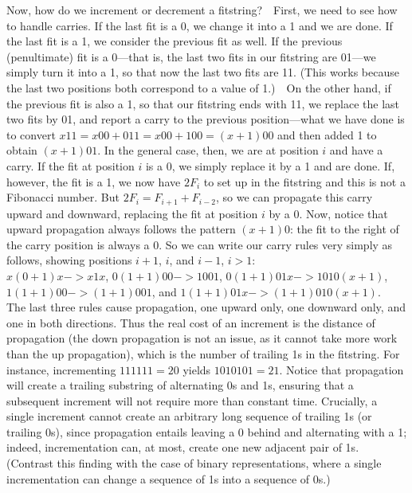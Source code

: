 \documentclass[11pt]{article}
\begin{document}
Now, how do we increment or decrement a fitstring?\ \ First, we need to see how
to handle carries.  If the last fit is a 0, we change it into a 1 and we are
done.  If the last fit is a 1, we consider the previous fit as well.  If the
previous (penultimate) fit is a 0---that is, the last two fits in our fitstring
are 01---we simply turn it into a 1, so that now the last two fits are 11.
(This works because the last two positions both correspond to a value of 1.)\ \
On the other hand, if the previous fit is also a 1, so that our fitstring ends
with 11, we replace the last two fits by 01, and report a carry to the previous
position---what we have done is to convert $x11 = x00 + 011 = x00 + 100 =
(x+1)00$ and then added 1 to obtain $(x+1)01$.  In the general case, then, we
are at position $i$ and have a carry.  If the fit at position $i$ is a 0, we
simply replace it by a 1 and are done.  If, however, the fit is a 1, we now
have $2F_i$ to set up in the fitstring and this is not a Fibonacci number.  But
$2F_i = F_{i+1} + F_{i-2}$, so we can propagate this carry upward and downward,
replacing the fit at position $i$ by a 0.  Now, notice that upward propagation
always follows the pattern $(x+1)0$: the fit to the right of the carry position
is always a 0.  So we can write our carry rules very simply as follows, showing
positions $i+1$, $i$, and $i-1$, $i>1$:\\ $x(0+1)x -> x1x$, $0(1+1)00 -> 1001$,
$0(1+1)01x -> 1010(x+1)$,\\ $1(1+1)00 -> (1+1)001$, and $1(1+1)01x ->
(1+1)010(x+1)$.\\ The last three rules cause propagation, one upward only, one
downward only, and one in both directions.  Thus the real cost of an increment
is the distance of propagation (the down propagation is not an issue, as it
cannot take more work than the up propagation), which is the number of trailing
1s in the fitstring.  For instance, incrementing $111111 = 20$ yields $1010101
= 21$.  Notice that propagation will create a trailing substring of alternating
0s and 1s, ensuring that a subsequent increment will not require more than
constant time.  Crucially, a single increment cannot create an arbitrary long
sequence of trailing 1s (or trailing 0s), since propagation entails leaving a 0
behind and alternating with a 1; indeed, incrementation can, at most, create
one new adjacent pair of 1s.  (Contrast this finding with the case of binary
representations, where a single incrementation can change a sequence of 1s into
a sequence of 0s.)
\end{document}
